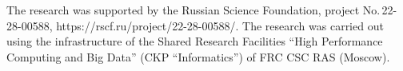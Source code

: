 



\vspace*{-12pt}

\Ack

\vspace*{-3pt}


     \noindent
     The research was supported by the Russian Science Foundation, project No.\,22-28-00588,
     {\sf 
https://rscf.ru/\linebreak project/22-28-00588/}. The research 
was carried out using the infrastructure of the Shared Research Facilities ``High Performance Computing 
and Big Data'' (CKP ``Informatics'') of FRC CSC RAS (Moscow).



